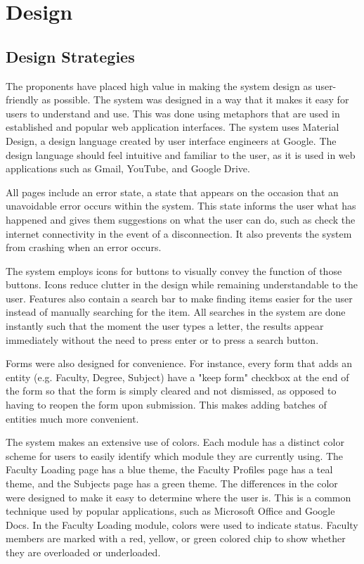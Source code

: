 \chapter{Design}
\section{Design Strategies}
The proponents have placed high value in making the system design as user-friendly as possible. The system was designed in a way that it makes it easy for users to understand and use. This was done using metaphors that are used in established and popular web application interfaces. The system uses Material Design, a design language created by user interface engineers at Google. The design language should feel intuitive and familiar to the user, as it is used in web applications such as Gmail, YouTube, and Google Drive.

All pages include an error state, a state that appears on the occasion that an unavoidable error occurs within the system. This state informs the user what has happened and gives them suggestions on what the user can do, such as check the internet connectivity in the event of a disconnection. It also prevents the system from crashing when an error occurs. 

The system employs icons for buttons to visually convey the function of those buttons. Icons reduce clutter in the design while remaining understandable to the user. Features also contain a search bar to make finding items easier for the user instead of manually searching for the item. All searches in the system are done instantly such that the moment the user types a letter, the results appear immediately without the need to press enter or to press a search button.

Forms were also designed for convenience. For instance, every form that adds an entity (e.g. Faculty, Degree, Subject) have a "keep form" checkbox at the end of the form so that the form is simply cleared and not dismissed, as opposed to having to reopen the form upon submission. This makes adding batches of entities much more convenient.

The system makes an extensive use of colors. Each module has a distinct color scheme for users to easily identify which module they are currently using. The Faculty Loading page has a blue theme, the Faculty Profiles page has a teal theme, and the Subjects page has a green theme. The differences in the color were designed to make it easy to determine where the user is. This is a common technique used by popular applications, such as Microsoft Office and Google Docs. In the Faculty Loading module, colors were used to indicate status. Faculty members are marked with a red, yellow, or green colored chip to show whether they are overloaded or underloaded.

